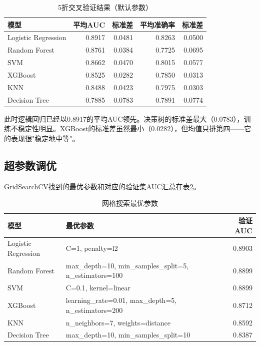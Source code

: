 \documentclass[12pt,a4paper]{ctexart}
\begin{document}
\begin{table}[H]
\centering
\caption{5折交叉验证结果（默认参数）}
\label{tab:cv-before}
\small
\begin{tabular}{lrrrr}
\toprule
\textbf{模型} & \textbf{平均AUC} & \textbf{标准差} & \textbf{平均准确率} & \textbf{标准差} \\
\midrule
Logistic Regression & 0.8917 & 0.0481 & 0.8263 & 0.0500 \\
Random Forest       & 0.8761 & 0.0384 & 0.7725 & 0.0695 \\
SVM                 & 0.8662 & 0.0470 & 0.8015 & 0.0577 \\
XGBoost             & 0.8525 & 0.0282 & 0.7850 & 0.0313 \\
KNN                 & 0.8488 & 0.0423 & 0.7975 & 0.0303 \\
Decision Tree       & 0.7885 & 0.0783 & 0.7891 & 0.0774 \\
\bottomrule
\end{tabular}
\end{table}

此时逻辑回归已经以0.8917的平均AUC领先。决策树的标准差最大（0.0783），训练不稳定性明显。XGBoost的标准差虽然最小（0.0282），但均值只排第四——它的表现很"稳定地中等"。

\subsection{超参数调优}

GridSearchCV找到的最优参数和对应的验证集AUC汇总在表\ref{tab:best-params}。

\begin{table}[H]
\centering
\caption{网格搜索最优参数}
\label{tab:best-params}
\small
\begin{tabular}{llr}
\toprule
\textbf{模型} & \textbf{最优参数} & \textbf{验证AUC} \\
\midrule
Logistic Regression & C=1, penalty=l2 & 0.8903 \\
Random Forest       & max\_depth=10, min\_samples\_split=5, n\_estimators=100 & 0.8899 \\
SVM                 & C=0.1, kernel=linear & 0.8899 \\
XGBoost             & learning\_rate=0.01, max\_depth=5, n\_estimators=200 & 0.8712 \\
KNN                 & n\_neighbors=7, weights=distance & 0.8592 \\
Decision Tree       & max\_depth=10, min\_samples\_split=10 & 0.8387 \\
\bottomrule
\end{tabular}
\end{table}
\end{document}
